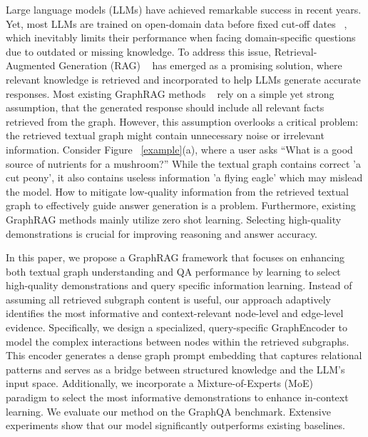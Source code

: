 

Large language models (LLMs) have achieved remarkable success in recent years. Yet, most LLMs are trained on open-domain data before fixed cut-off dates ~\cite{gpt2}, which inevitably limits their performance when facing domain-specific questions due to outdated or missing knowledge. To address this issue, Retrieval-Augmented Generation (RAG) ~\cite{replug, graphrag} has emerged as a promising solution, where relevant knowledge is retrieved and incorporated to help LLMs generate accurate responses. 
Most existing GraphRAG methods ~\cite{graphrag,gretriever} rely on a simple yet strong assumption, that the generated response should include all relevant facts retrieved from the graph. However, this assumption overlooks a critical problem: the retrieved textual graph might contain unnecessary noise or irrelevant information.
Consider Figure ~\ref{example}(a), where a user asks “What is a good source of nutrients for a mushroom?” While the textual graph contains correct 'a cut peony', it also contains useless information 'a flying eagle' which may mislead the model. 
How to mitigate low-quality information from the retrieved textual graph to effectively guide answer generation is a problem.
Furthermore, existing GraphRAG methods mainly utilize zero shot learning. Selecting
high-quality demonstrations is crucial for improving reasoning and answer accuracy.

In this paper, we propose a GraphRAG framework that focuses on enhancing both textual graph understanding and QA performance by learning to select high-quality demonstrations and query specific information learning. 
Instead of assuming all retrieved subgraph content is useful, our approach adaptively identifies the most informative and context-relevant node-level and edge-level evidence. 
Specifically, we design a specialized, query-specific GraphEncoder to model the complex interactions between nodes within the retrieved subgraphs. 
This encoder generates a dense graph prompt embedding that captures relational patterns and serves as a bridge between structured knowledge and the LLM’s input space. 
Additionally, we incorporate a Mixture-of-Experts (MoE) ~\cite{deepseekmoe} paradigm to select the most informative demonstrations to enhance in-context learning. 
We evaluate our method on the GraphQA benchmark. Extensive experiments show that our model significantly outperforms existing baselines. 

